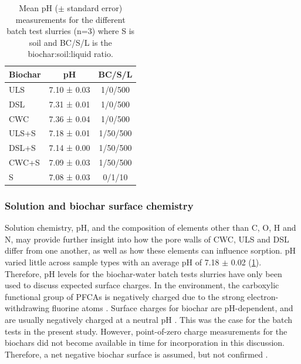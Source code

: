 \begin{table}
\centering
\caption{Mean pH ($\pm$ standard error) measurements for the different batch test slurries (n=3) where S is soil and BC/S/L is the biochar:soil:liquid ratio.}
\label{tab:pHcond}
\begin{tabular}{lcc}
\toprule
Biochar & \multicolumn{1}{c}{pH} & BC/S/L\\ \midrule
ULS   & 7.10 ± 0.03 & 1/0/500\\
DSL   & 7.31 ± 0.01 & 1/0/500\\
CWC   & 7.36 ± 0.04 & 1/0/500\\
ULS+S & 7.18 ± 0.01 & 1/50/500\\
DSL+S & 7.14 ± 0.00 & 1/50/500\\
CWC+S & 7.09 ± 0.03 & 1/50/500\\
S     & 7.08 ± 0.03 & 0/1/10\\
\bottomrule
\end{tabular}
\end{table}


\subsubsection{Solution and biochar surface chemistry \label{sec:inorganic}} 
Solution chemistry, pH, and the composition of elements other than C, O, H and N, may provide further insight into how the pore walls of CWC, ULS and DSL differ from one another, as well as how these elements can influence sorption. pH varied little across sample types with an average pH of 7.18 $\pm$ 0.02 (\cref{tab:pHcond}). Therefore, pH levels for the biochar-water batch tests slurries have only been used to discuss expected surface charges. In the environment, the carboxylic functional group of PFCAs is negatively charged due to the strong electron-withdrawing fluorine atoms \citep{goss2008pKa}. Surface charges for biochar are pH-dependent, and are usually negatively charged at a neutral pH \citep{zhang2013sorption}. This was the case for the batch tests in the present study. However, point-of-zero charge measurements for the biochars did not become available in time for incorporation in this discussion. Therefore, a net negative biochar surface is assumed, but not confirmed \citep{saeidi2020understanding}.

